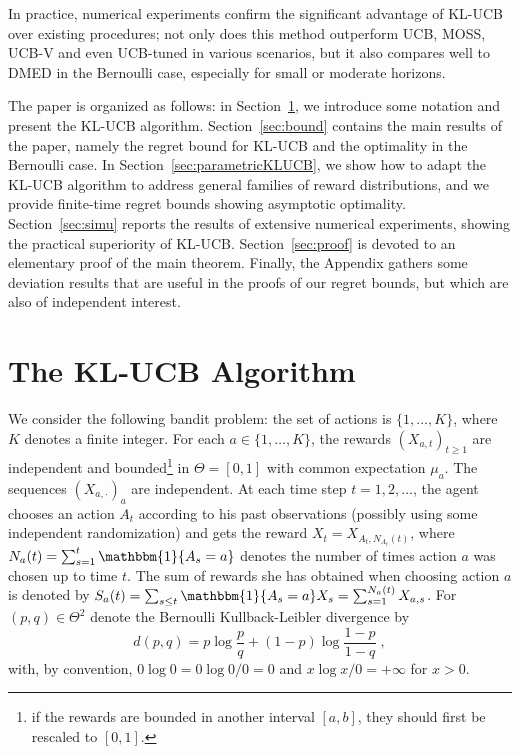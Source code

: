 \documentclass[wcp]{jmlr}
\newcommand{\1}{\mathbbm{1}}
\begin{document}
In practice, numerical experiments confirm the significant advantage of KL-UCB
over existing procedures; not only does this method outperform UCB, MOSS,
UCB-V and even UCB-tuned in various scenarios, but it also compares well to DMED in the Bernoulli case, especially for small or moderate horizons.

The paper is organized as follows: in Section~\ref{sec:algo}, we introduce some
notation and present the KL-UCB algorithm.  Section~\ref{sec:bound} contains the main results of the paper, namely the regret bound for KL-UCB and
the optimality in the Bernoulli case. In Section~\ref{sec:parametricKLUCB}, we show how to adapt the KL-UCB algorithm to address general families of reward distributions, and we provide finite-time regret bounds showing asymptotic optimality. Section~\ref{sec:simu} reports the
results of extensive numerical experiments, showing the practical superiority of
KL-UCB. Section~\ref{sec:proof} is devoted to an elementary proof of the main
theorem. 
Finally, the Appendix gathers some deviation results that are useful in the proofs of our regret bounds, but which are also of independent interest.

\section{The KL-UCB Algorithm}\label{sec:algo}
We consider the following bandit problem: the set of actions is
$\{1,\dots,K\}$, where $K$ denotes a finite integer.  For each
$a\in\{1,\dots,K\}$, the rewards $(X_{a,t})_{t\geq 1}$ are independent and
bounded\footnote{if the rewards are bounded in another interval $[a,b]$, they should first be rescaled to $[0,1]$.} in $\Theta = [0,1]$ with common expectation $\mu_a$. The sequences
$(X_{a,\cdot})_a$ are independent.  At each time step $t=1,2,\dots$, the agent
chooses an action $A_t$ according to his past observations (possibly using some
independent randomization) and gets the reward $X_t = X_{A_t, N_{A_t}(t)}$,
where $N_a(t) = \sum_{s=1}^t \1\{A_s = a\}$ denotes the number of times action $a$ was chosen up to time $t$. The sum of rewards she has obtained when choosing action $a$ is denoted by $S_a(t) = \sum_{s\leq t} \1\{A_s = a\} X_s =
\sum_{s=1}^{N_a(t)} X_{a,s}$. 
For $(p,q)\in \Theta^2$ denote the Bernoulli
Kullback-Leibler divergence by
\[d(p,q) = p\log\frac{p}{q} + (1-p)\log\frac{1-p}{1-q}\;,\] with, by convention, $0\log0 = 0\log0/0 =0$ and
$x\log x/0=+\infty$ for $x>0$.
\end{document}

